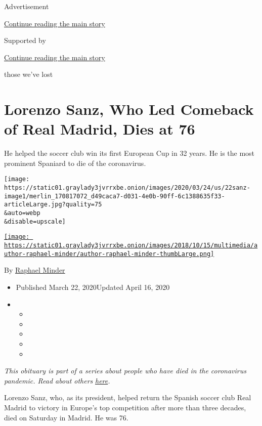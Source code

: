 Advertisement

\protect\hyperlink{after-top}{Continue reading the main story}

Supported by

\protect\hyperlink{after-sponsor}{Continue reading the main story}

those we've lost

\hypertarget{lorenzo-sanz-who-led-comeback-of-real-madrid-dies-at-76}{%
\section{Lorenzo Sanz, Who Led Comeback of Real Madrid, Dies at
76}\label{lorenzo-sanz-who-led-comeback-of-real-madrid-dies-at-76}}

He helped the soccer club win its first European Cup in 32 years. He is
the most prominent Spaniard to die of the coronavirus.

\texttt{[image: https://static01.graylady3jvrrxbe.onion/images/2020/03/24/us/22sanz-image1/merlin\_170817072\_d49caca7-d031-4e0b-90ff-6c1388635f33-articleLarge.jpg?quality=75\\\&auto=webp\\\&disable=upscale]}

\href{https://www.nytimes3xbfgragh.onion/by/raphael-minder}{\texttt{[image: https://static01.graylady3jvrrxbe.onion/images/2018/10/15/multimedia/author-raphael-minder/author-raphael-minder-thumbLarge.png]}}

By \href{https://www.nytimes3xbfgragh.onion/by/raphael-minder}{Raphael
Minder}

\begin{itemize}
\item
  Published March 22, 2020Updated April 16, 2020
\item
  \begin{itemize}
  \item
  \item
  \item
  \item
  \item
  \end{itemize}
\end{itemize}

\emph{This obituary is part of a series about people who have died in
the coronavirus pandemic. Read about others}
\href{https://www.nytimes3xbfgragh.onion/series/people-who-have-died-of-the-coronavirus}{\emph{here}}\emph{.}

Lorenzo Sanz, who, as its president, helped return the Spanish soccer
club Real Madrid to victory in Europe's top competition after more than
three decades, died on Saturday in Madrid. He was 76.

